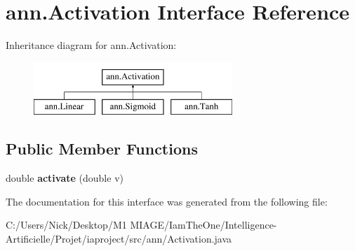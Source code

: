 \hypertarget{interfaceann_1_1_activation}{}\section{ann.\+Activation Interface Reference}
\label{interfaceann_1_1_activation}
Inheritance diagram for ann.\+Activation\+:\begin{figure}[H]
\begin{center}
\leavevmode
\includegraphics[height=2.000000cm]{interfaceann_1_1_activation}
\end{center}
\end{figure}
\subsection*{Public Member Functions}
\begin{DoxyCompactItemize}
\item 
\mbox{\label{interfaceann_1_1_activation_a792856c4231dfcccc7cf7ab9739bc48f}} 
double {\bfseries activate} (double v)
\end{DoxyCompactItemize}


The documentation for this interface was generated from the following file\+:\begin{DoxyCompactItemize}
\item 
C\+:/\+Users/\+Nick/\+Desktop/\+M1 M\+I\+A\+G\+E/\+Iam\+The\+One/\+Intelligence-\/\+Artificielle/\+Projet/iaproject/src/ann/Activation.\+java\end{DoxyCompactItemize}
